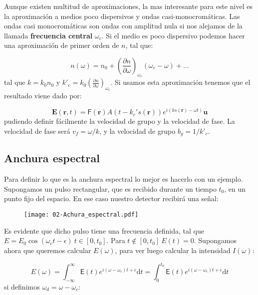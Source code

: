 \documentclass[12pt,a4paper]{book}
\numberwithin{equation}{section}
\numberwithin{figure}{section}
\newcommand{\parentesis}[1]{\left( #1  \right)}
\newcommand{\parciales}[2]{\frac{\partial #1}{\partial #2}}
\newcommand{\D}{\mathrm{d}}
\newcommand{\1}{_{(1)}}
\newcommand{\2}{_{(2)}}
\newcommand{\un}{\mathbf{u}}
\newcommand{\rn}{\mathbf{r}}
\newcommand{\En}{\mathbf{E}}
\theoremstyle{definition}
\begin{document}
Aunque existen multitud de aproximaciones, la mas interesante para este nivel es la aproximación a medios poco dispersivos y ondas casi-monocromáticas. Las ondas casi monocromáticas son ondas con amplitud nula si nos alejamos de la llamada \textbf{frecuencia central} $\omega_c$. Si el medio es poco dispersivo podemos hacer una aproximación de primer orden de $n$, tal que:

\begin{equation}
n(\omega) = n_0 +  \parentesis{\parciales{n}{\omega}}_{\omega_c} (\omega_c - \omega) + \ldots
\end{equation}
tal que $k = k_0 n_0$ y $k'_c = k_0 \parentesis{\parciales{n}{\omega}}_{\omega_c}$. Si usamos esta aproximación tenemos que el resultado viene dado por:

\begin{equation}
\En (\rn,t) = \mathsf{F} (\rn) A(t-k_c's(\rn)) e^{i (k s(\rn) - \omega t) } \un
\end{equation}
pudiendo definir fácilmente la velocidad de grupo y la velocidad de fase. La velocidad de fase será $v_f=\omega/k$, y la velocidad de grupo $b_g=1/k'_c$. \\

\subsection{Anchura espectral}

Para definir lo que es la anchura espectral lo mejor es hacerlo con un ejemplo. Supongamos un pulso rectangular, que es recibido durante un tiempo $t_0$, en un punto fijo del espacio. En ese caso nuestro detector recibirá una señal:

\begin{figure}[h!] \centering
 \texttt{[image: 02-Achura\_espectral.pdf]}
\end{figure}

Es evidente que dicho pulso tiene una frecuencia definida, tal que $E =E_0 \cos (\omega_c t - \epsilon) \ t \in [0,t_0]$. Para $t \notin [0,t_0] \ E(t)=0$. Supongamos ahora que queremos calcular $E(\omega)$, para ver luego calcular la intensidad $I(\omega)$:

\begin{equation}
E (\omega) = \int_{-\infty}^{\infty} \mathsf{E}(t) e^{i (\omega-\omega_c)t + \epsilon} \D t = \int_{0}^{t_0} \mathsf{E}(t) e^{i (\omega-\omega_c)t + \epsilon} \D t 
\end{equation}
si definimos $\omega_d = \omega-\omega_c$:
\end{document}
